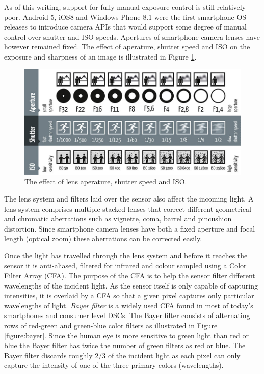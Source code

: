 \documentclass[thesis.tex]{subfiles}
\begin{document}
As of this writing, support for fully manual exposure control is still relatively poor. Android 5, iOS8 and Windows Phone 8.1 were the first smartphone OS releases to introduce camera APIs that would support some degree of manual control over shutter and ISO speeds. Apertures of smartphone camera lenses have however remained fixed. The effect of aperature, shutter speed and ISO on the exposure and sharpness of an image is illustrated in Figure \ref{figure:iso-shutterspeed-iso}.

\begin{figure}[h]
\centering \includegraphics[width=\textwidth]{images/photography-shutter-speed-aperture-iso}
\caption{The effect of lens aperature, shutter speed and ISO. \cite{hamburger-fotospots}}
\label{figure:iso-shutterspeed-iso}
\end{figure}

The lens system and filters laid over the sensor also affect the incoming light. A lens system comprises multiple stacked lenses that correct different geometrical and chromatic aberrations such as vignette, coma, barrel and pincushion distortion. Since smartphone camera lenses have both a fixed aperture and focal length (optical zoom) these aberrations can be corrected easily. \cite{color_pipeline}

Once the light has travelled through the lens system and before it reaches the sensor it is anti-aliased, filtered for infrared and colour sampled using a Color Filter Array (CFA). The purpose of the CFA is to help the sensor filter different wavelengths of the incident light. As the sensor itself is only capable of capturing intensities, it is overlaid by a CFA so that a given pixel captures only particular wavelengths of light. \textit{Bayer filter} is a widely used CFA found in most of today's smartphones and consumer level DSCs. The Bayer filter consists of alternating rows of red-green and green-blue color filters as illustrated in Figure \ref{figure:bayer}. Since the human eye is more sensitive to green light than red or blue the Bayer filter has twice the number of green filters as red or blue. The Bayer filter discards roughly 2/3 of the incident light as each pixel can only capture the intensity of one of the three primary colors (wavelengths).
\end{document}
